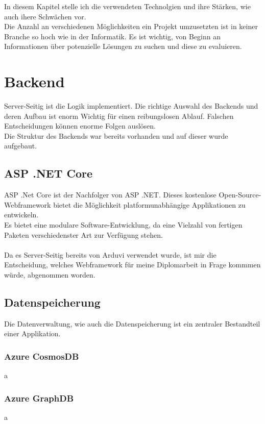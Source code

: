 In diesem Kapitel stelle ich die verwendeten Technolgien und ihre Stärken, 
wie auch ihere Schwächen vor.
\\
Die Anzahl an verschiedenen Möglichkeiten ein Projekt umzusetzten ist in keiner 
Branche so hoch wie in der Informatik. Es ist wichtig, von Beginn an Informationen 
über potenzielle Lösungen zu suchen und diese zu evaluieren.

\section{Backend}
Server-Seitig ist die Logik implementiert. Die richtige Auswahl des Backends und deren Aufbau ist
enorm Wichtig für einen reibungslosen Ablauf. Falschen Entscheidungen können enorme Folgen auslösen.
\\
Die Struktur des Backends war bereits vorhanden und auf dieser wurde aufgebaut.

    \subsection{ASP .NET Core}
    ASP .Net Core ist der Nachfolger von ASP .NET.  Dieses kostenlose Open-Source-Webframework
    bietet die Möglichkeit platformunabhängige Applikationen zu entwickeln.
    \\
    Es bietet eine modulare Software-Entwicklung, da eine Vielzahl von fertigen Paketen
    verschiedenster Art zur Verfügung stehen.
    \\\\
    Da es Server-Seitig bereits von Arduvi verwendet wurde, ist mir die Entscheidung, welches
    Webframework für meine Diplomarbeit in Frage kommmen würde, abgenommen worden.


    \subsection{Datenspeicherung}
    Die Datenverwaltung, wie auch die Datenspeicherung ist ein zentraler Bestandteil
    einer Applikation.

        \subsubsection{Azure CosmosDB}
        a

        \subsubsection{Azure GraphDB}
        a

